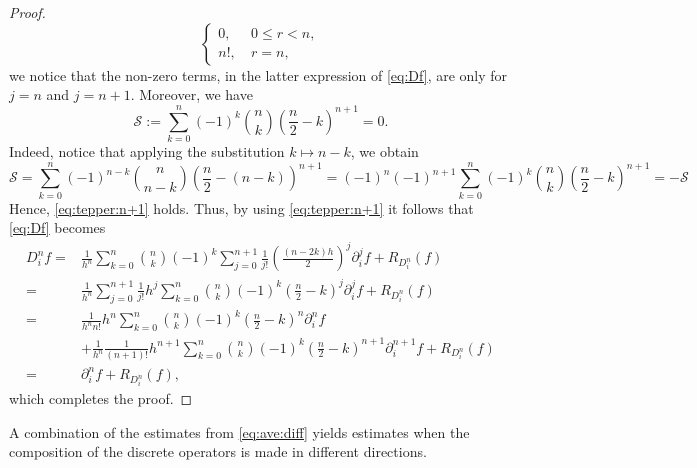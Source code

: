 \documentclass[11pt,oneside,leqno]{amsart}
\numberwithin{equation}{section}
\numberwithin{equation}{section}
\begin{document}
\begin{proof}
$$\begin{cases}
    0,&\ 0\leq r<n, \\
    n!,&\ r=n, 
\end{cases}$$ 
we notice that the non-zero terms, in the latter expression of \eqref{eq:Df}, are only for $j=n$ and $j=n+1$. Moreover, we have 
  \begin{equation}\label{eq:tepper:n+1}
      \mathcal{S}:=\sum_{k=0}^{n}(-1)^{k}\binom{n}{k}\left(\frac{n}{2}-k\right)^{n+1}=0.   
  \end{equation}
  Indeed, notice that applying the substitution $k\mapsto n-k$, we obtain
  \begin{equation*}
      \mathcal{S}=\sum_{k=0}^{n}(-1)^{n-k}\binom{n}{n-k}\left(\frac{n}{2}-(n-k)\right)^{n+1}=(-1)^{n}(-1)^{n+1}\sum_{k=0}^{n}(-1)^{k}\binom{n}{k}\left(\frac{n}{2}-k\right)^{n+1}=-\mathcal{S}
  \end{equation*}
  Hence, \eqref{eq:tepper:n+1} holds.
  Thus, by using \eqref{eq:tepper:n+1} it follows that \eqref{eq:Df} becomes
        \begin{equation}
        \begin{split}
        D_{i}^{n}f=&\frac{1}{h^{n}}\sum_{k=0}^{n}\binom{n}{k}(-1)^{k}\sum_{j=0}^{n+1}\frac{1}{j!}\left(\frac{(n-2k)h}{2} \right)^{j}\partial_{i}^{j}f+R_{D_{i}^{n}}(f)\\
        =&\frac{1}{h^{n}}\sum_{j=0}^{n+1}\frac{1}{j!}h^{j}\sum_{k=0}^{n}\binom{n}{k}(-1)^{k}\left(\frac{n}{2}-k \right)^{j}\partial_{i}^{j}f+R_{D_{i}^{n}}(f)\\
        =&\frac{1}{h^{n}n!}h^{n}\sum_{k=0}^{n}\binom{n}{k}(-1)^{k}\left(\frac{n}{2}-k \right)^{n}\partial_{i}^{n}f\\
        &+\frac{1}{h^{n}}\frac{1}{(n+1)!}h^{n+1}\sum_{k=0}^{n}\binom{n}{k}(-1)^{k}\left(\frac{n}{2}-k \right)^{n+1}\partial_{i}^{n+1}f+R_{D_{i}^{n}}(f)\\
        =&\partial_{i}^{n}f+R_{D_{i}^{n}}(f),
    \end{split}
\end{equation} 
which completes the proof.
\end{proof}
A combination of the estimates from \eqref{eq:ave:diff} yields estimates when the composition of the discrete operators is made in different directions.
\end{document}
